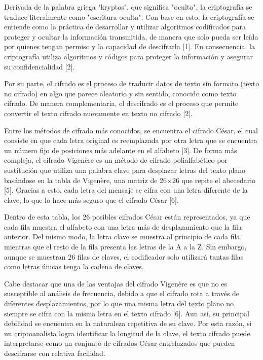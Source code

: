 \documentclass[letterpaper,12pt,oneside]{article}
\begin{document}
Derivada de la palabra griega "kryptos", que significa "oculto", la criptografía se traduce literalmente como "escritura oculta". Con base en esto, la criptografía se entiende como la práctica de desarrollar y utilizar algoritmos codificados para proteger y ocultar la información transmitida, de manera que solo pueda ser leída por quienes tengan permiso y la capacidad de descifrarla [1]. En consecuencia, la criptografía utiliza algoritmos y códigos para proteger la información y asegurar su confidencialidad [2].

Por su parte, el cifrado es el proceso de traducir datos de texto sin formato (texto no cifrado) en algo que parece aleatorio y sin sentido, conocido como texto cifrado. De manera complementaria, el descifrado es el proceso que permite convertir el texto cifrado nuevamente en texto no cifrado [2].

Entre los métodos de cifrado más conocidos, se encuentra el cifrado César, el cual consiste en que cada letra original es reemplazada por otra letra que se encuentra un número fijo de posiciones más adelante en el alfabeto [3]. De forma más compleja, el cifrado Vigenère es un método de cifrado polialfabético por sustitución que utiliza una palabra clave para desplazar letras del texto plano basándose en la tabla de Vigenère, una matriz de 26×26 que repite el abecedario [5]. Gracias a esto, cada letra del mensaje se cifra con una letra diferente de la clave, lo que lo hace más seguro que el cifrado César [6].

Dentro de esta tabla, los 26 posibles cifrados César están representados, ya que cada fila muestra el alfabeto con una letra más de desplazamiento que la fila anterior. Del mismo modo, la letra clave se muestra al principio de cada fila, mientras que el resto de la fila presenta las letras de la A a la Z. Sin embargo, aunque se muestran 26 filas de claves, el codificador solo utilizará tantas filas como letras únicas tenga la cadena de claves.

Cabe destacar que una de las ventajas del cifrado Vigenère es que no es susceptible al análisis de frecuencia, debido a que el cifrado rota a través de diferentes desplazamientos, por lo que una misma letra del texto plano no siempre se cifra con la misma letra en el texto cifrado [6]. Aun así, su principal debilidad se encuentra en la naturaleza repetitiva de su clave. Por esta razón, si un criptoanalista logra identificar la longitud de la clave, el texto cifrado puede interpretarse como un conjunto de cifrados César entrelazados que pueden descifrarse con relativa facilidad.
\end{document}
